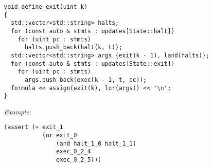 \begin{lstlisting}[style=c++]
void define_exit(uint k)
{
  std::vector<std::string> halts;
  for (const auto & stmts : updates[State::halt])
    for (uint pc : stmts)
      halts.push_back(halt(k, t));
  std::vector<std::string> args {exit(k - 1), land(halts)};
  for (const auto & stmts : updates[State::exit])
    for (uint pc : stmts)
      args.push_back(exec(k - 1, t, pc));
  formula << assign(exit(k), lor(args)) << '\n';
}
\end{lstlisting}

\noindent
\emph{Example:} 

\begin{lstlisting}[style=smtlib]
(assert (= exit_1
           (or exit_0
               (and halt_1_0 halt_1_1)
               exec_0_2_4
               exec_0_2_5)))
\end{lstlisting}



